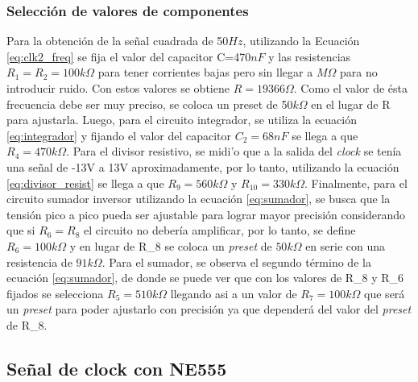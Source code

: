 \documentclass[11pt, a4paper]{article}
\begin{document}
\subsubsection{Selecci\'on de valores de componentes}
\noindent
Para la obtenci\'on de la señal cuadrada de 50$Hz$, utilizando la Ecuaci\'on \ref{eq:clk2_freq} se fija el valor del capacitor C=470$nF$ y las resistencias $R_1=R_2=100k\Omega$ para tener corrientes bajas pero sin llegar a $M\Omega$ para no introducir ruido. Con estos valores se obtiene $R=19366\Omega$. Como el valor de \'esta frecuencia debe ser muy preciso, se coloca un preset de 50$k\Omega$ en el lugar de R para ajustarla.\newline
Luego, para el circuito integrador, se utiliza la ecuaci\'on \ref{eq:integrador} y fijando el valor del capacitor $C_2=68nF$ se llega a que $R_4 = 470k\Omega$.
Para el divisor resistivo, se midi'o que a la salida del \textit{clock} se ten\'ia una se\~nal de -13V a 13V aproximadamente, por lo tanto, utilizando la ecuaci\'on \ref{eq:divisor_resist} se llega a que $R_9=560k\Omega$ y $R_{10}=330k\Omega$.\newline
Finalmente, para el circuito sumador inversor utilizando la ecuaci\'on \ref{eq:sumador}, se busca que la tensi\'on pico a pico pueda ser ajustable para lograr mayor precisi\'on considerando que si $R_6=R_8$ el circuito no deber\'ia amplificar, por lo tanto, se define $R_6=100k\Omega$ y en lugar de R_8 se coloca un \textit{preset} de $50k\Omega$ en serie con una resistencia de $91k\Omega$.
Para el sumador,  se observa el segundo t\'ermino de la ecuaci\'on \ref{eq:sumador}, de donde se puede ver que con los valores de R_8 y R_6 fijados se selecciona $R_5=510k\Omega$ llegando asi a un valor de $R_7 = 100k\Omega$ que ser\'a un \textit{preset} para poder ajustarlo con precisi\'on ya que depender\'a del valor del \textit{preset} de R_8.
%
\subsection{Señal de clock con NE555}
%
\end{document}
